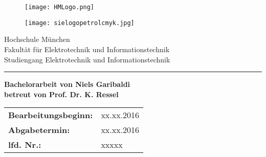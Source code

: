 \begin{titlepage}
	\begin{figure}[h]
		
		\begin{minipage}{0.45\linewidth} 
			\raggedright 
			\texttt{[image: HMLogo.png]} 
		\end{minipage} 
		\begin{minipage}{0.45\linewidth} 
			\raggedleft
			\vspace*{1 cm} 
			\texttt{[image: sielogopetrolcmyk.jpg]} 
		\end{minipage} 
	\end{figure}
	\begin{center} 
		\vspace{1.5 cm} {\LARGE Hochschule München} \\ 
		\vspace{1 cm} {\LARGE Fakultät für Elektrotechnik und Informationstechnik} \\ 
		\vspace{2 cm} {\Large Studiengang Elektrotechnik und Informationstechnik} \\ 
		\vspace*{2 cm}{\Huge \bf Industrie 4.0 - Pathfinding auf einer SPS\\} 
		\vspace{1 cm}
		\hrule
		\vspace*{1 cm}{\Huge \bf Industry 4.0 - Pathfinding on a PLC\\} 
		\vspace{2 cm}
		{\bf Bachelorarbeit von Niels Garibaldi}\\
		\vspace{1 cm}
		{\bf betreut von  Prof. Dr. K. Ressel}\\
		
	\end{center}
	\vspace{1 cm}
	\begin{center}
		
		\begin{tabular}{ll}
			
			{\bf Bearbeitungsbeginn:} & xx.xx.2016\\
			{\bf Abgabetermin:} & xx.xx.2016\\
			{\bf lfd. Nr.:} & xxxxx\\
		\end{tabular}
	\end{center}
	
\end{titlepage}


